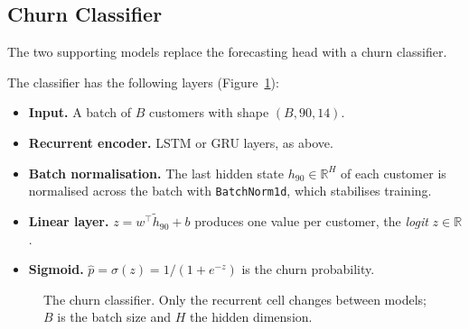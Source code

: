 \documentclass{article}
\newcommand{\R}{\mathbb{R}}
\begin{document}
\subsection{Churn Classifier}

The two supporting models replace the forecasting head with a churn classifier.

The classifier has the following layers (Figure~\ref{fig:w2_arch}):
\begin{itemize}
    \item \textbf{Input.} A batch of $B$ customers with shape $(B, 90, 14)$.
    \item \textbf{Recurrent encoder.} LSTM or GRU layers, as above.
    \item \textbf{Batch normalisation.} The last hidden state $h_{90} \in \R^{H}$ of each customer is normalised across the batch with \texttt{BatchNorm1d}, which stabilises training.
    \item \textbf{Linear layer.} $z = w^\top \tilde{h}_{90} + b$ produces one value per customer, the \emph{logit} $z \in \R$.
    \item \textbf{Sigmoid.} $\hat{p} = \sigma(z) = 1 / (1 + e^{-z})$ is the churn probability.
\end{itemize}

\begin{figure}[H]
\centering
{}
\caption{The churn classifier. Only the recurrent cell changes between models; $B$ is the batch size and $H$ the hidden dimension.}
\label{fig:w2_arch}
\end{figure}
\end{document}

